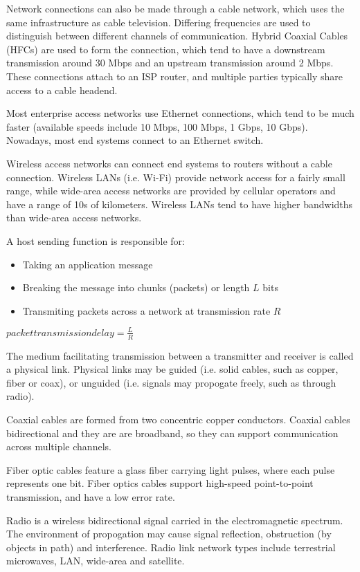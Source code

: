 \documentclass[12pt,titlepage]{article}
\begin{document}
      Network connections can also be made through a cable network, which uses the same infrastructure as cable television.
      Differing frequencies are used to distinguish between different channels of communication. Hybrid Coaxial Cables (HFCs) are
      used to form the connection, which tend to have a downstream transmission around 30 Mbps and an upstream transmission around
      2 Mbps. These connections attach to an ISP router, and multiple parties typically share access to a cable headend.

      Most enterprise access networks use Ethernet connections, which tend to be much faster (available speeds include 10 Mbps, 100 Mbps,
      1 Gbps, 10 Gbps). Nowadays, most end systems connect to an Ethernet switch.

      Wireless access networks can connect end systems to routers without a cable connection. Wireless LANs (i.e. Wi-Fi) provide network
      access for a fairly small range, while wide-area access networks are provided by cellular operators and have a range of 10s of
      kilometers. Wireless LANs tend to have higher bandwidths than wide-area access networks.

      A host sending function is responsible for:
        \begin{itemize}
          \item Taking an application message
          \item Breaking the message into chunks (packets) or length $L$ bits
          \item Transmiting packets across a network at transmission rate $R$
        \end{itemize}
      $packet transmission delay = \frac{L}{R}$

      The medium facilitating transmission between a transmitter and receiver is called a physical link. Physical links may be guided
      (i.e. solid cables, such as copper, fiber or coax), or unguided (i.e. signals may propogate freely, such as through radio).

      Coaxial cables are formed from two concentric copper conductors. Coaxial cables bidirectional and they are are broadband, so they
      can support communication across multiple channels.

      Fiber optic cables feature a glass fiber carrying light pulses, where each pulse represents one bit. Fiber optics cables support
      high-speed point-to-point transmission, and have a low error rate.

      Radio is a wireless bidirectional signal carried in the electromagnetic spectrum. The environment of propogation may cause signal
      reflection, obstruction (by objects in path) and interference. Radio link network types include terrestrial microwaves, LAN, wide-area
      and satellite.
\end{document}
